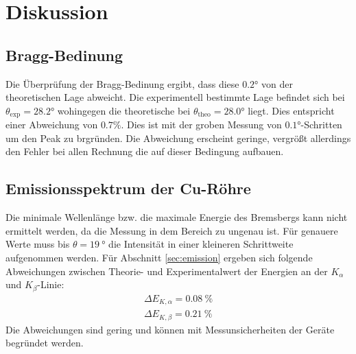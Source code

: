 \section{Diskussion}
\label{sec:Diskussion}
\subsection{Bragg-Bedinung}
Die Überprüfung der Bragg-Bedinung ergibt, dass diese $0.2\si{\degree}$ von der theoretischen Lage abweicht.
Die experimentell bestimmte Lage befindet sich bei $\theta_\text{exp} = 28.2\si{\degree}$ wohingegen die theoretische bei $\theta_\text{theo}= 28.0\si{\degree}$ liegt.
Dies entspricht einer Abweichung von $0.7\%$.
Dies ist mit der groben Messung von $0.1\si{\degree}$-Schritten um den Peak zu brgründen.
Die Abweichung erscheint geringe, vergrößt allerdings den Fehler bei allen Rechnung die auf dieser Bedingung aufbauen.

\subsection{Emissionsspektrum der Cu-Röhre}
Die minimale Wellenlänge bzw. die maximale Energie des Bremsbergs kann nicht ermittelt werden, da die Messung in dem Bereich zu ungenau ist.
Für genauere Werte muss bis $\theta = \SI{19}{\degree}$ die Intensität in einer kleineren Schrittweite aufgenommen werden.
Für Abschnitt \ref{sec:emission} ergeben sich folgende Abweichungen zwischen Theorie- und Experimentalwert der Energien an der $K_\alpha$ und $K_\beta$-Linie: 
\begin{align*}
    \Delta E_{K,\alpha} = \SI{0.08}{\percent} \\
    \Delta E_{K,\beta} = \SI{0.21}{\percent}
\end{align*}
Die Abweichungen sind gering und können mit Messunsicherheiten der Geräte begründet werden.
\\
